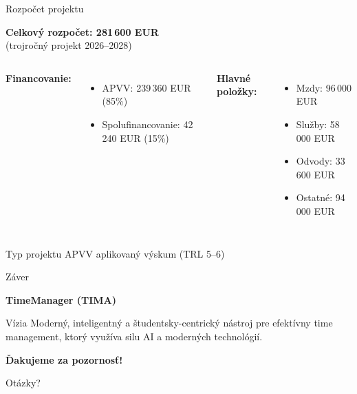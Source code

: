 \documentclass{beamer}
\begin{document}
\begin{frame}{Rozpočet projektu}
\begin{center}
\textbf{Celkový rozpočet: 281\,600 EUR}\\
\small (trojročný projekt 2026--2028)
\end{center}

\vspace{0.5cm}

\begin{columns}
\textbf{Financovanie:}
\begin{itemize}
\item APVV: 239\,360 EUR (85\%)
\item Spolufinancovanie: 42\,240 EUR (15\%)
\end{itemize}

\textbf{Hlavné položky:}
\begin{itemize}
\item Mzdy: 96\,000 EUR
\item Služby: 58\,000 EUR
\item Odvody: 33\,600 EUR
\item Ostatné: 94\,000 EUR
\end{itemize}
\end{columns}

\vspace{0.5cm}

\begin{block}{Typ projektu}
APVV aplikovaný výskum (TRL 5--6)
\end{block}
\end{frame}

\begin{frame}{Záver}
\begin{center}
\LARGE
\textbf{TimeManager (TIMA)}
\end{center}

\vspace{0.5cm}
\begin{block}{Vízia}
Moderný, inteligentný a študentsky-centrický nástroj pre efektívny time management, ktorý využíva silu AI a moderných technológií.
\end{block}

\vspace{0.5cm}
\begin{center}
\textbf{Ďakujeme za pozornosť!}

\vspace{0.3cm}
Otázky?
\end{center}
\end{frame}
\end{document}

